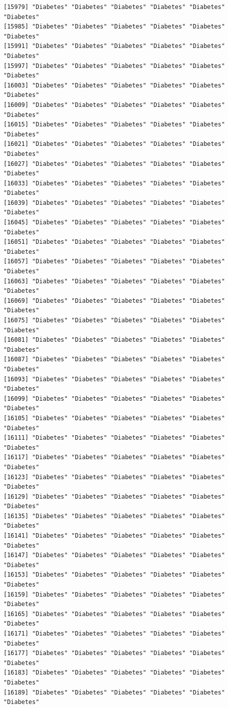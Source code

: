 \documentclass[
  letterpaper,
  DIV=11,
  numbers=noendperiod]{scrartcl}
\begin{document}
\begin{verbatim}
[15979] "Diabetes" "Diabetes" "Diabetes" "Diabetes" "Diabetes" "Diabetes"
[15985] "Diabetes" "Diabetes" "Diabetes" "Diabetes" "Diabetes" "Diabetes"
[15991] "Diabetes" "Diabetes" "Diabetes" "Diabetes" "Diabetes" "Diabetes"
[15997] "Diabetes" "Diabetes" "Diabetes" "Diabetes" "Diabetes" "Diabetes"
[16003] "Diabetes" "Diabetes" "Diabetes" "Diabetes" "Diabetes" "Diabetes"
[16009] "Diabetes" "Diabetes" "Diabetes" "Diabetes" "Diabetes" "Diabetes"
[16015] "Diabetes" "Diabetes" "Diabetes" "Diabetes" "Diabetes" "Diabetes"
[16021] "Diabetes" "Diabetes" "Diabetes" "Diabetes" "Diabetes" "Diabetes"
[16027] "Diabetes" "Diabetes" "Diabetes" "Diabetes" "Diabetes" "Diabetes"
[16033] "Diabetes" "Diabetes" "Diabetes" "Diabetes" "Diabetes" "Diabetes"
[16039] "Diabetes" "Diabetes" "Diabetes" "Diabetes" "Diabetes" "Diabetes"
[16045] "Diabetes" "Diabetes" "Diabetes" "Diabetes" "Diabetes" "Diabetes"
[16051] "Diabetes" "Diabetes" "Diabetes" "Diabetes" "Diabetes" "Diabetes"
[16057] "Diabetes" "Diabetes" "Diabetes" "Diabetes" "Diabetes" "Diabetes"
[16063] "Diabetes" "Diabetes" "Diabetes" "Diabetes" "Diabetes" "Diabetes"
[16069] "Diabetes" "Diabetes" "Diabetes" "Diabetes" "Diabetes" "Diabetes"
[16075] "Diabetes" "Diabetes" "Diabetes" "Diabetes" "Diabetes" "Diabetes"
[16081] "Diabetes" "Diabetes" "Diabetes" "Diabetes" "Diabetes" "Diabetes"
[16087] "Diabetes" "Diabetes" "Diabetes" "Diabetes" "Diabetes" "Diabetes"
[16093] "Diabetes" "Diabetes" "Diabetes" "Diabetes" "Diabetes" "Diabetes"
[16099] "Diabetes" "Diabetes" "Diabetes" "Diabetes" "Diabetes" "Diabetes"
[16105] "Diabetes" "Diabetes" "Diabetes" "Diabetes" "Diabetes" "Diabetes"
[16111] "Diabetes" "Diabetes" "Diabetes" "Diabetes" "Diabetes" "Diabetes"
[16117] "Diabetes" "Diabetes" "Diabetes" "Diabetes" "Diabetes" "Diabetes"
[16123] "Diabetes" "Diabetes" "Diabetes" "Diabetes" "Diabetes" "Diabetes"
[16129] "Diabetes" "Diabetes" "Diabetes" "Diabetes" "Diabetes" "Diabetes"
[16135] "Diabetes" "Diabetes" "Diabetes" "Diabetes" "Diabetes" "Diabetes"
[16141] "Diabetes" "Diabetes" "Diabetes" "Diabetes" "Diabetes" "Diabetes"
[16147] "Diabetes" "Diabetes" "Diabetes" "Diabetes" "Diabetes" "Diabetes"
[16153] "Diabetes" "Diabetes" "Diabetes" "Diabetes" "Diabetes" "Diabetes"
[16159] "Diabetes" "Diabetes" "Diabetes" "Diabetes" "Diabetes" "Diabetes"
[16165] "Diabetes" "Diabetes" "Diabetes" "Diabetes" "Diabetes" "Diabetes"
[16171] "Diabetes" "Diabetes" "Diabetes" "Diabetes" "Diabetes" "Diabetes"
[16177] "Diabetes" "Diabetes" "Diabetes" "Diabetes" "Diabetes" "Diabetes"
[16183] "Diabetes" "Diabetes" "Diabetes" "Diabetes" "Diabetes" "Diabetes"
[16189] "Diabetes" "Diabetes" "Diabetes" "Diabetes" "Diabetes" "Diabetes"

\end{verbatim}
\end{document}
